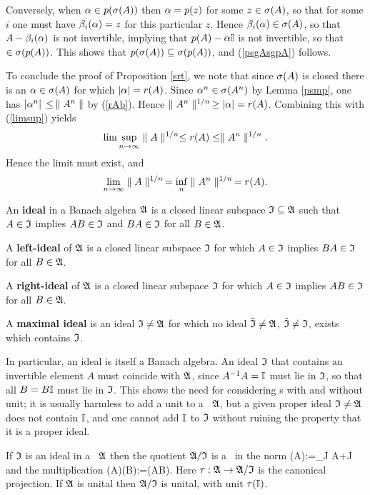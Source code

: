 Conversely, when $\alpha\in p(\sigma(A))$ then $\alpha=p(z)$ for some
$z\in\sigma(A)$, so that for some $i$ one must have $\beta_i(\alpha)=z$ for
this particular $z$. Hence $\beta_i(\alpha)\in\sigma(A)$, so that
$A-\beta_i(\alpha)$ is not invertible, implying that $p(A)-\alpha{\Bbb I}$ is not
invertible, so that $\sl\in\sigma(p(A))$. This shows that
$p(\sigma(A))\subseteq \sigma(p(A))$, and (\ref{psgAsgpA}) follows.  \enp

To conclude the proof of Proposition \ref{srt}, we note that since
$\sigma(A)$ is closed there is an $\alpha\in\sigma(A)$ for which
$|\alpha|=r(A)$. Since $\alpha^n\in\sigma(A^n)$ by Lemma \ref{psmp}, one has
$|\alpha^n|\,\leq\,\parallel A^n\parallel$ by (\ref{rAb}). Hence $\parallel A^n\parallel^{1/n}\,\geq
|\alpha|=r(A)$.  Combining this with (\ref{limsup}) yields
$$
\lim\sup_{n\rightarrow\infty} \parallel A\parallel^{1/n}\leq r(A)\leq \parallel A^n\parallel^{1/n}.
$$
Hence the limit must exist, and $$ \lim_{n\rightarrow\infty} \parallel A\parallel^{1/n}\,
=\inf_n \parallel A^n\parallel^{1/n}\, = r(A).  $$
\enp
\begin{Definition} An {\bf ideal} in a Banach algebra
${\frak A}$ is a closed linear subspace ${\frak I}\subseteq{\frak A}$ such that $A\in{\frak I}$
implies $AB\in{\frak I}$ and $BA\in{\frak I}$ for all $B\in{\frak A}$.

A {\bf left-ideal} of ${\frak A}$ is a closed linear subspace ${\frak I}$ for which
 $A\in{\frak I}$ implies $BA\in{\frak I}$ for all $B\in{\frak A}$.

A {\bf right-ideal} of ${\frak A}$ is a closed linear subspace ${\frak I}$ for
 which $A\in{\frak I}$ implies $AB\in{\frak I}$ for all $B\in{\frak A}$.


A {\bf maximal ideal} is an ideal ${\frak I}\neq{\frak A}$ for which no ideal
$\tilde{{\frak I}}\neq{\frak A}$, $\tilde{{\frak I}}\neq {\frak I}$, exists which contains
${\frak I}$. \end{Definition}

In particular, an ideal is itself a Banach algebra.  An ideal ${\frak I}$
that contains an invertible element $A$ must coincide with ${\frak A}$, since
$A^{-1} A={\Bbb I}$ must lie in ${\frak I}$, so that all $B=B{\Bbb I}$ must lie in
${\frak I}$. This shows the need for considering \BA s with and without
unit; it is usually harmless to add a unit to a \BA\ ${\frak A}$, but a given
proper ideal ${\frak I}\neq{\frak A}$ does not contain ${\Bbb I}$, and one cannot add
${\Bbb I}$ to ${\frak I}$ without ruining the property that it is a proper ideal.
\begin{Proposition}
If ${\frak I}$ is an ideal in a \BA\ ${\frak A}$ then the quotient ${\frak A}/{\frak I}$ is a
\BA\ in the norm \be \n \ta(A)\n:=\inf_{J\in\GI} {\n A+J\n} 
\ee and the multiplication \be \ta(A)\ta(B):=\ta(AB).  \ee
Here $\tau:{\frak A}\rightarrow{\frak A}/{\frak I}$ is the canonical projection.  If ${\frak A}$ is
unital then ${\frak A}/{\frak I}$ is unital, with unit $\tau({\Bbb I})$.
\end{Proposition}

